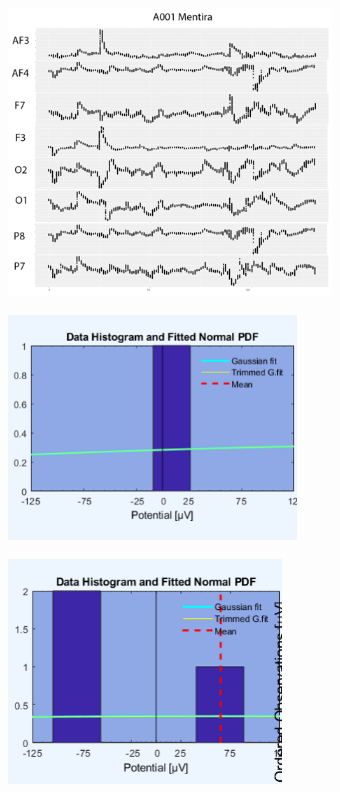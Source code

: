 \begin{center}
\includegraphics[height=3.0in]{figuras/Imagen6.png}
\end{center}

\begin{center}
\includegraphics[height=2.35in]{figuras/Imagen7.png}
\end{center}

\begin{center}
\includegraphics[height=2.35in]{figuras/Imagen8.png}
\end{center}

